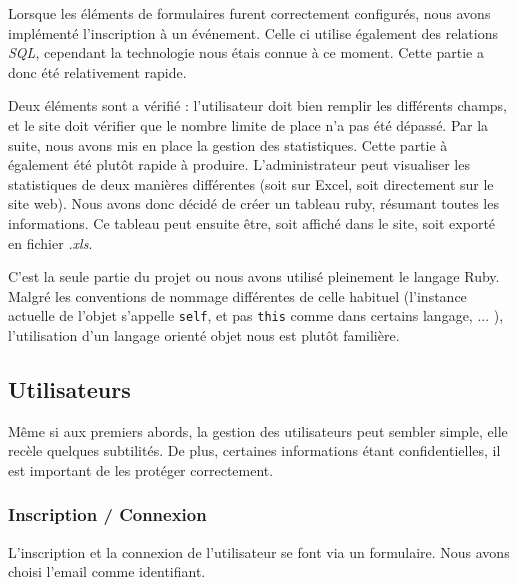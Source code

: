 \documentclass[a4paper,11pt]{article}
\begin{document}
\medbreak
Lorsque les éléments de formulaires furent correctement configurés,  nous avons implémenté l'inscription à un événement. Celle ci utilise également des relations \textit{SQL}, cependant la technologie nous étais connue à ce moment. Cette partie a donc été relativement rapide. 

Deux éléments sont a vérifié : l'utilisateur doit bien remplir les différents champs, et le site doit vérifier que le nombre limite de place n'a pas été dépassé.
\medbreak
Par la suite, nous avons mis en place la gestion des statistiques. 
Cette partie à également été plutôt rapide à produire. L'administrateur peut visualiser les statistiques de deux manières différentes (soit sur Excel, soit directement sur le site web). Nous avons donc décidé de créer un tableau ruby, résumant toutes les informations. Ce tableau peut ensuite être, soit affiché dans le site, soit exporté en fichier \textit{.xls}. 

C'est la seule partie du projet ou nous avons utilisé pleinement le langage Ruby. Malgré les conventions de nommage différentes de celle habituel (l'instance actuelle de l'objet s'appelle \verb!self!, et pas \verb!this! comme dans certains langage, ... ), l'utilisation d'un langage orienté objet nous est plutôt familière.   

\subsection{Utilisateurs}

Même si aux premiers abords, la gestion des utilisateurs peut sembler simple, elle recèle quelques subtilités. De plus, certaines informations étant confidentielles, il est important de les protéger correctement.

\subsubsection{Inscription / Connexion}

L'inscription et la connexion de l'utilisateur se font via un formulaire. Nous avons choisi l'email comme identifiant. 
\end{document}

